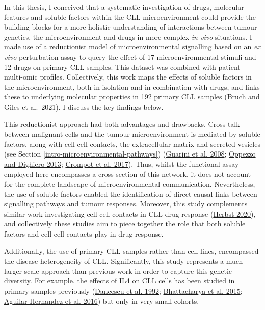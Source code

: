\documentclass[11pt, a4paper, twosided]{book}
\begin{document}
In this thesis, I conceived that a systematic investigation of drugs, molecular features and soluble factors within the CLL microenvironment could provide the building blocks for a more holistic understanding of interactions between tumour genetics, the microenvironment and drugs in more complex \emph{in vivo} situations. I made use of a reductionist model of microenvironmental signalling based on an \emph{ex vivo} perturbation assay to query the effect of 17 microenvironmental stimuli and 12 drugs on primary CLL samples. This dataset was combined with patient multi-omic profiles. Collectively, this work maps the effects of soluble factors in the microenvironment, both in isolation and in combination with drugs, and links these to underlying molecular properties in 192 primary CLL samples (Bruch and Giles et al.~2021). I discuss the key findings below.

This reductionist approach had both advantages and drawbacks. Cross-talk between malignant cells and the tumour microenvironment is mediated by soluble factors, along with cell-cell contacts, the extracellular matrix and secreted vesicles (see Section \ref{intro-microenvironmental-pathways}) (\protect\hyperlink{ref-Guarini2008}{Guarini et al. 2008}; \protect\hyperlink{ref-Oppezzo2013}{Oppezzo and Dighiero 2013}; \protect\hyperlink{ref-Crompot2017}{Crompot et al. 2017}). Thus, whilst the functional assay employed here encompasses a cross-section of this network, it does not account for the complete landscape of microenvironmental communication. Nevertheless, the use of soluble factors enabled the identification of direct causal links between signalling pathways and tumour responses. Moreover, this study complements similar work investigating cell-cell contacts in CLL drug response (\protect\hyperlink{ref-HerbstThesis}{Herbst 2020}), and collectively these studies aim to piece together the role that both soluble factors and cell-cell contacts play in drug response.

Additionally, the use of primary CLL samples rather than cell lines, encompassed the disease heterogeneity of CLL. Significantly, this study represents a much larger scale approach than previous work in order to capture this genetic diversity. For example, the effects of IL4 on CLL cells has been studied in primary samples previously (\protect\hyperlink{ref-Dancescu1992}{Dancescu et al. 1992}; \protect\hyperlink{ref-Bhattacharya2015}{Bhattacharya et al. 2015}; \protect\hyperlink{ref-AguilarHernandez2016}{Aguilar-Hernandez et al. 2016}) but only in very small cohorts.
\end{document}
